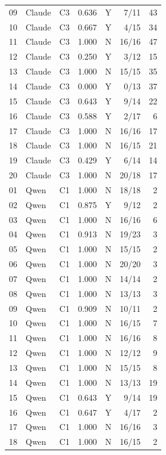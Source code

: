 \begin{longtable}{llrrlrr}
    09 & Claude & C3 & 0.636 & Y & 7/11 & 43 \\
    10 & Claude & C3 & 0.667 & Y & 4/15 & 34 \\
    11 & Claude & C3 & 1.000 & N & 16/16 & 47 \\
    12 & Claude & C3 & 0.250 & Y & 3/12 & 15 \\
    13 & Claude & C3 & 1.000 & N & 15/15 & 35 \\
    14 & Claude & C3 & 0.000 & Y & 0/13 & 37 \\
    15 & Claude & C3 & 0.643 & Y & 9/14 & 22 \\
    16 & Claude & C3 & 0.588 & Y & 2/17 & 6 \\
    17 & Claude & C3 & 1.000 & N & 16/16 & 17 \\
    18 & Claude & C3 & 1.000 & N & 16/15 & 21 \\
    19 & Claude & C3 & 0.429 & Y & 6/14 & 14 \\
    20 & Claude & C3 & 1.000 & N & 20/18 & 17 \\
    01 & Qwen & C1 & 1.000 & N & 18/18 & 2 \\
    02 & Qwen & C1 & 0.875 & Y & 9/12 & 2 \\
    03 & Qwen & C1 & 1.000 & N & 16/16 & 6 \\
    04 & Qwen & C1 & 0.913 & N & 19/23 & 3 \\
    05 & Qwen & C1 & 1.000 & N & 15/15 & 2 \\
    06 & Qwen & C1 & 1.000 & N & 20/20 & 3 \\
    07 & Qwen & C1 & 1.000 & N & 14/14 & 2 \\
    08 & Qwen & C1 & 1.000 & N & 13/13 & 3 \\
    09 & Qwen & C1 & 0.909 & N & 10/11 & 2 \\
    10 & Qwen & C1 & 1.000 & N & 16/15 & 7 \\
    11 & Qwen & C1 & 1.000 & N & 16/16 & 8 \\
    12 & Qwen & C1 & 1.000 & N & 12/12 & 9 \\
    13 & Qwen & C1 & 1.000 & N & 15/15 & 8 \\
    14 & Qwen & C1 & 1.000 & N & 13/13 & 19 \\
    15 & Qwen & C1 & 0.643 & Y & 9/14 & 19 \\
    16 & Qwen & C1 & 0.647 & Y & 4/17 & 2 \\
    17 & Qwen & C1 & 1.000 & N & 16/16 & 3 \\
    18 & Qwen & C1 & 1.000 & N & 16/15 & 2 \\

\end{longtable}
